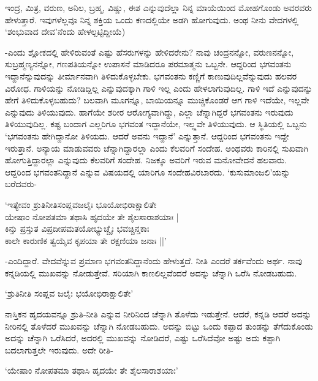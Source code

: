 ಇಂದ್ರ, ಮಿತ್ರ, ವರುಣ, ಅನಿಲ, ಬ್ರಹ್ಮ, ವಿಷ್ಣು, ಈಶ ಎನ್ನುವುದೆಲ್ಲಾ ನಿನ್ನ ಮಾಯೆಯಿಂದ ಮೋಹಗೊಂಡು ಅವರವರು ಹೇಳುತ್ತಾರೆ. ಇವುಗಳೆಲ್ಲವೂ ನಿನ್ನ ಶಕ್ತಿಯ ಒಂದು ಕಣದಲ್ಲಿಯೇ ಅಡಗಿ ಹೋಗುವುದು. ಅಂಥ ನೀನು ವೇದಗಳಲ್ಲಿ `ಶಂಭುವಾದ ದೇವ'ನೆಂದು ಹೇಳಲ್ಪಟ್ಟಿದ್ದೀಯೆ)

-ಎಂದು ಶ್ಲೋಕದಲ್ಲಿ ಹೇಳಿರುವಂತೆ ಎಷ್ಟು ಹೆಸರುಗಳನ್ನು ಹೇಳಿದರೇನು? ನಾವು ಚಂದ್ರನನ್ನೋ, ವರುಣನನ್ನೋ, ಸುಬ್ರಹ್ಮಣ್ಯನನ್ನೋ, ಗಣಪತಿಯನ್ನೋ ಉಪಾಸನೆ ಮಾಡಿದರೂ ಪರಮಾತ್ಮನು ಒಬ್ಬನೇ. ಆದ್ದರಿಂದ ಭಗವಂತನು ಇದ್ದಾನೆನ್ನುವುದನ್ನು ತೀರ್ಮಾನವಾಗಿ ತಿಳಿದುಕೊಳ್ಳಬೇಕು. ಭಗವಂತನು ಕಣ್ಣಿಗೆ ಕಾಣುವುದಿಲ್ಲವೆನ್ನುವುದು ಹಲವರ ವಿರೋಧ. ಗಾಳಿಯನ್ನು ನೋಡಿದ್ದಿಲ್ಲ ಎನ್ನುವುದಕ್ಕಾಗಿ ಗಾಳಿ ಇಲ್ಲ ಎಂದು ಹೇಳಲಾಗುವುದಿಲ್ಲ. ಗಾಳಿ ಇದೆ ಎನ್ನುವುದನ್ನು ಹೇಗೆ ತಿಳಿದುಕೊಳ್ಳಬಹುದು? ಬಲವಾಗಿ ಮೂಗನ್ನೂ, ಬಾಯಿಯನ್ನೂ ಮುಚ್ಚಿಕೊಂಡರೆ ಆಗ ಗಾಳಿ ಇದೆಯೇ, ಇಲ್ಲವೇ ಎನ್ನುವುದು ತಿಳಿಯುವುದು. ಹಾಗೆಯೇ ಶರೀರ ಆರೋಗ್ಯವಾಗಿದ್ದು, ಎಲ್ಲಾ ಚೆನ್ನಾಗಿದ್ದರೆ ಭಗವಂತನು ಇರುವುದು ತಿಳಿಯುವುದಿಲ್ಲ. ಕಷ್ಟ ಬಂದಾಗ ಎಲ್ಲರಿಗೂ ಭಗವಂತ ಇದ್ದಾನೆಯೇ, ಇಲ್ಲ್ಲವೇ ತಿಳಿಯುವುದು. ಆ ಸ್ಥಿತಿಯಲ್ಲಿ ಒಬ್ಬನು `ಭಗವಂತನು ಹೇಗಿದ್ದಾನೋ ತಿಳಿಯದು. ಆದರೆ ಅವನು ಇದ್ದಾನೆ' ಎನ್ನುತ್ತಾನೆ. ಆದ್ದರಿಂದ ಭಗವಂತನು ಇದ್ದೇ ಇರುತ್ತಾನೆ. ಅನ್ಯಾಯ ಮಾಡುವವರು ಚೆನ್ನಾಗಿದ್ದಾರಲ್ಲಾ ಎಂದು ಕೆಲವರಿಗೆ ಸಂದೇಹ. ಅಂಥವರು ಕಾರಿನಲ್ಲಿ ಸುಖವಾಗಿ ಹೋಗುತ್ತಿದ್ದಾರಲ್ಲಾ ಎನ್ನುವುದು ಕೆಲವರಿಗೆ ಸಂದೇಹ. ನಿಜಕ್ಕೂ ಅವರಿಗೆ ಇರುವ ಮನೋವೇದನೆ ಹಲವಾರು. ಆದ್ದರಿಂದ ಭಗವಂತನಿದ್ದಾನೆ ಎನ್ನುವ ವಿಷಯದಲ್ಲಿ ಯಾರಿಗೂ ಸಂದೇಹವಿರಬಾರದು. `ಕುಸುಮಾಂಜಲಿ'ಯನ್ನು ಬರೆದವರು-

\begin{shloka}
`ಇತ್ಯೇವಂ ಶ್ರುತಿನೀತಿಸಂಪ್ಲವಜಲೈಃ ಭೂಯೋಭಿರಾಕ್ಷಾಲಿತೇ\\
ಯೇಷಾಂ ನೋಪತಮಾ ತಥಾಸಿ ಹೃದಯೇ ತೇ ಶೈಲಸಾರಾಶಯಾಃ |\\
ಕಿನ್ತು ಪ್ರಸ್ತುತ ವಿಪ್ರದೀಪಮತಯೋಭ್ಯುಚ್ಚೈಃ ಭವಚ್ಚಿನ್ತಕಾಃ\\
ಕಾಲೇ ಕಾರುಣಿಕ ತ್ವಯೈವ ಕೃಪಯಾ ತೇ ರಕ್ಷಣಿಯಾ ಜನಾಃ ||'
\end{shloka}

-ಎಂದಿದ್ದಾರೆ. ವೇದವೆನ್ನುವ ಪ್ರಮಾಣ ಭಗವಂತನಿದ್ದಾನೆಂದು ಹೇಳುತ್ತದೆ. ನೀತಿ ಎಂದರೆ ತರ್ಕವೆಂದು ಅರ್ಥ. ನಾವು ಕನ್ನಡಿಯಲ್ಲಿ ಮುಖವನ್ನು ನೋಡುತ್ತೇವೆ. ಸರಿಯಾಗಿ ಕಾಣಲಿಲ್ಲವೆಂದರೆ ಅದನ್ನು ಚೆನ್ನಾಗಿ ಒರೆಸಿ ನೋಡಬಹುದು.

\begin{shloka}
`ಶ್ರುತಿನೀತಿ ಸಂಪ್ಲವ ಜಲೈಃ ಭಯೋಭಿರಾಕ್ಷಾಲಿತೇ'
\end{shloka}

ನಾಸ್ತಿಕನ ಹೃದಯವನ್ನೂ ಶ್ರುತಿ-ನೀತಿ ಎನ್ನುವ ನೀರಿನಿಂದ ಚೆನ್ನಾಗಿ ತೊಳೆದು ಇಡುತ್ತೇನೆ. ಆದರೆ, ಕನ್ನಡಿ ಆದರೆ ಅದನ್ನು ನೀರಿನಲ್ಲಿ ತೊಳೆದರೆ ಮುಖವನ್ನು ಚೆನ್ನಾಗಿ ನೋಡಬಹುದು. ಅದನ್ನು ಬಿಟ್ಟು ಒಂದು ಕಪ್ಪಾದ ತುಂಡನ್ನು ತೆಗೆದುಕೊಂಡು ಅದನ್ನು ಚೆನ್ನಾಗಿ ಒರೆಸಿದರೆ, ಅದರಲ್ಲಿ ಮುಖವನ್ನು ನೋಡಿದರೆ, ಎಷ್ಟು ಒರೆಸಿದೆವೋ ಅಷ್ಟು ಅದು ಕಪ್ಪಾಗಿ ಬದಲಾಗುತ್ತಲೇ ಇರುವುದು. ಅದೇ ರೀತಿ-

\begin{shloka}
`ಯೇಷಾಂ ನೋಪತಮಾ ತಥಾಸಿ ಹೃದಯೇ ತೇ ಶೈಲಸಾರಾಶಯಾಃ'
\end{shloka}

